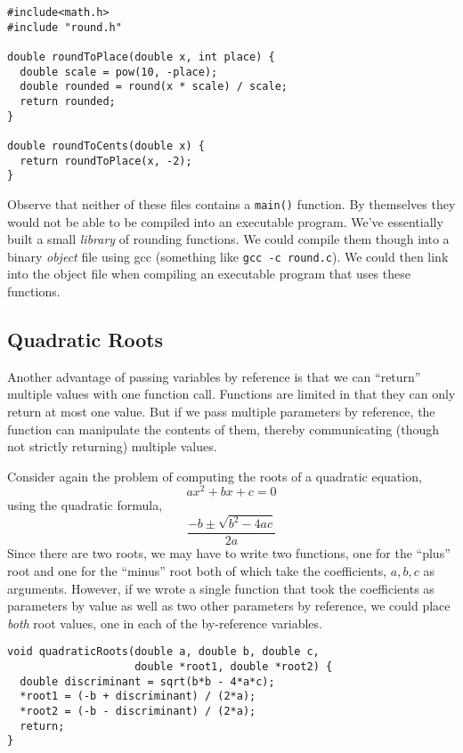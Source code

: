 \begin{verbatim}
#include<math.h>
#include "round.h"

double roundToPlace(double x, int place) {
  double scale = pow(10, -place);
  double rounded = round(x * scale) / scale;
  return rounded;
}

double roundToCents(double x) {
  return roundToPlace(x, -2);
}
\end{verbatim}

Observe that neither of these files contains a \texttt{main()}
function.  By themselves they would not be able to be compiled
into an executable program.  We've essentially built a small 
\emph{library} of rounding functions.  We could compile them though
into a binary \emph{object} file using gcc (something like 
\texttt{gcc -c round.c}).  We could then link into the object
file when compiling an executable program that uses these functions.

\subsection{Quadratic Roots}

Another advantage of passing variables by reference is that we
can ``return'' multiple values with one function call.  Functions
are limited in that they can only return at most one value.  But
if we pass multiple parameters by reference, the function can
manipulate the contents of them, thereby communicating (though
not strictly returning) multiple values.  

Consider again the problem of computing the roots of a quadratic
equation, 
  $$ax^2 + bx + c = 0$$
using the quadratic formula,
 $$\frac{-b \pm \sqrt{b^2 - 4ac}}{2a}$$
Since there are two roots, we may have to write two functions, 
one for the ``plus'' root and one for the ``minus'' root both of 
which take the coefficients, $a, b, c$ as arguments.  However,
if we wrote a single function that took the coefficients as parameters
by value as well as two other parameters by reference, we could
place \emph{both} root values, one in each of the by-reference
variables.

\begin{verbatim}
void quadraticRoots(double a, double b, double c, 
                    double *root1, double *root2) {
  double discriminant = sqrt(b*b - 4*a*c);
  *root1 = (-b + discriminant) / (2*a);
  *root2 = (-b - discriminant) / (2*a);
  return;
}
\end{verbatim}

